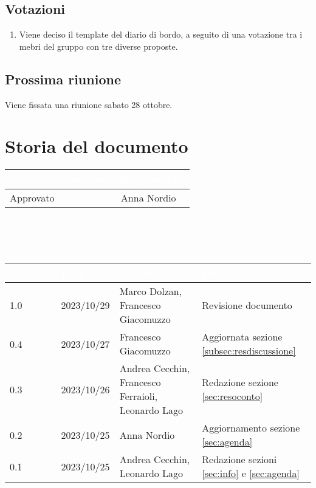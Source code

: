 \documentclass[12pt]{article}
\begin{document}
\begin{enumerate}
\end{enumerate}

\subsection{Votazioni} \label{subsec:resvotazione}
\begin{enumerate}
    \item Viene deciso il template del diario di bordo, a seguito di una votazione tra i mebri del gruppo con tre diverse proposte.
\end{enumerate}

\subsection{Prossima riunione} \label{subsec:riunione}
Viene fissata una riunione sabato 28 ottobre.

\section{Storia del documento} \label{sec:storia}
\begingroup
\setlength{\tabcolsep}{10pt}
\renewcommand{\arraystretch}{1.5}
\begin{tabularx}{\textwidth}{| X | X |}
    \hline
    \rowcolor{headerrow} \textbf{\textcolor{white}{Stato del documento}} & \textbf{\textcolor{white}{Responsabile}} \\
    \hline
    Approvato &Anna Nordio\\
    \hline   
\end{tabularx}
\\\\\\
\begin{tabularx}{\textwidth}{| l | l | X | X |}
    \hline
    \rowcolor{headerrow} \textbf{\textcolor{white}{Versione}} & \textbf{\textcolor{white}{Data}} & \textbf{\textcolor{white}{Autori}} & \textbf{\textcolor{white}{Descrizione}} \\
    \hline
    1.0 & 2023/10/29 & Marco Dolzan, Francesco Giacomuzzo & Revisione documento \\
    \hline
    0.4 & 2023/10/27 & Francesco Giacomuzzo & Aggiornata sezione \ref{subsec:resdiscussione}\\
    \hline
    0.3 & 2023/10/26 & Andrea Cecchin, Francesco Ferraioli, Leonardo Lago & Redazione sezione \ref{sec:resoconto}\\
    \hline
    0.2 & 2023/10/25 & Anna Nordio & Aggiornamento sezione \ref{sec:agenda}\\
    \hline
    0.1 & 2023/10/25 & Andrea Cecchin, Leonardo Lago & Redazione sezioni \ref{sec:info} e \ref{sec:agenda}\\
    \hline
\end{tabularx}
\endgroup
\end{document}
